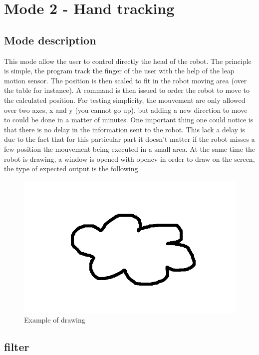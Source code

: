 \section{Mode 2 - Hand tracking}

\subsection{Mode description}

This mode allow the user to control directly the head of the robot. The principle is simple, the program track the finger of the user with the help of the leap motion sensor. The position is then scaled to fit in the robot moving area (over the table for instance). A command is then issued to order the robot to move to the calculated position. For testing simplicity, the mouvement are only allowed over two axes, x and y (you cannot go up), but adding a new direction to move to could be done in a matter of minutes.
One important thing one could notice is that there is no delay in the information sent to the robot. This lack a delay is due to the fact that for this particular part it doesn't matter if the robot misses a few position the mouvement being executed in a small area.
At the same time the robot is drawing, a window is opened with opencv in order to draw on the screen, the type of expected output is the following.

\begin{figure}[H]
	\includegraphics[scale = 0.5]{cloud}
	\centering
	\caption{Example of drawing}
	\label{fig:letter}
\end{figure}

\subsection{filter}

